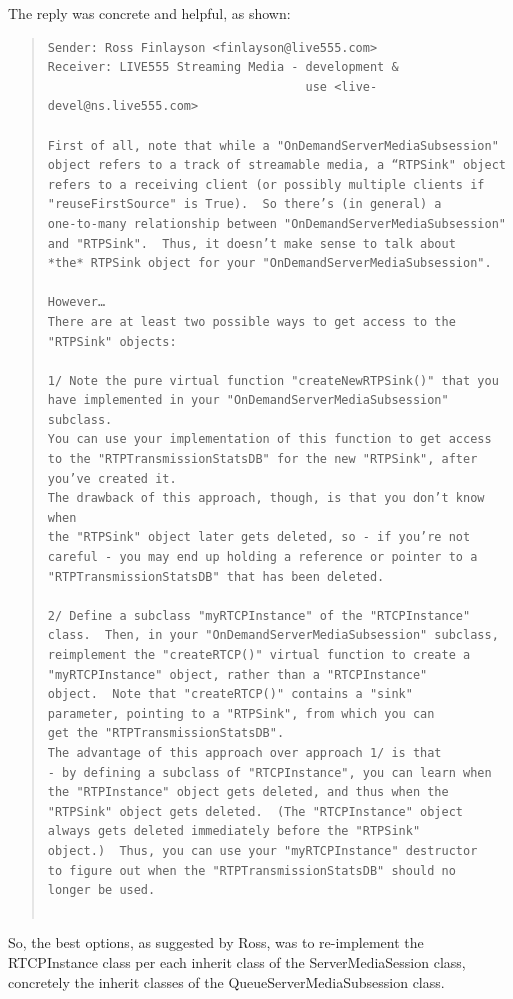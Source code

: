 The reply was concrete and helpful, as shown:
\begin{quote}
\begin{verbatim}
Sender: Ross Finlayson <finlayson@live555.com>
Receiver: LIVE555 Streaming Media - development & 
									use <live-devel@ns.live555.com> 
									
First of all, note that while a "OnDemandServerMediaSubsession" 
object refers to a track of streamable media, a “RTPSink" object 
refers to a receiving client (or possibly multiple clients if 
"reuseFirstSource" is True).  So there’s (in general) a 
one-to-many relationship between "OnDemandServerMediaSubsession" 
and "RTPSink".  Thus, it doesn’t make sense to talk about 
*the* RTPSink object for your "OnDemandServerMediaSubsession".

However…
There are at least two possible ways to get access to the 
"RTPSink" objects:

1/ Note the pure virtual function "createNewRTPSink()" that you 
have implemented in your "OnDemandServerMediaSubsession" subclass.  
You can use your implementation of this function to get access 
to the "RTPTransmissionStatsDB" for the new "RTPSink", after 
you’ve created it.
The drawback of this approach, though, is that you don’t know when 
the "RTPSink" object later gets deleted, so - if you’re not 
careful - you may end up holding a reference or pointer to a 
"RTPTransmissionStatsDB" that has been deleted.

2/ Define a subclass "myRTCPInstance" of the "RTCPInstance" 
class.  Then, in your "OnDemandServerMediaSubsession" subclass, 
reimplement the "createRTCP()" virtual function to create a 
"myRTCPInstance" object, rather than a "RTCPInstance" 
object.  Note that "createRTCP()" contains a "sink" 
parameter, pointing to a "RTPSink", from which you can 
get the "RTPTransmissionStatsDB".
The advantage of this approach over approach 1/ is that 
- by defining a subclass of "RTCPInstance", you can learn when 
the "RTPInstance" object gets deleted, and thus when the 
"RTPSink" object gets deleted.  (The "RTCPInstance" object 
always gets deleted immediately before the "RTPSink" 
object.)  Thus, you can use your "myRTCPInstance" destructor 
to figure out when the "RTPTransmissionStatsDB" should no 
longer be used.
									
\end{verbatim}
\end{quote} 

So, the best options, as suggested by Ross, was to re-implement the RTCPInstance class per each inherit class of the ServerMediaSession class, concretely the inherit classes of the QueueServerMediaSubsession class. 

